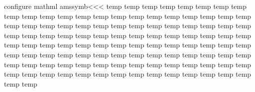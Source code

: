 {{{{{{\<configure mathml amssymb\><<<
\def\:tempa#1"#2#3///{%
   \edef\:next{\noexpand\Configure{MathClass}{\ifnum 0=#2
                                     \mathordMathClass \else #2\fi}}%
   \:next
}
\def\:temp#1{\expandafter\:tempc\meaning#1//}
\def\:tempb#1{\:tempa#1///{}{}{}{#1}}
\def\:tempc#1"#2//{\:tempd#2...//}
\def\:tempd#1#2#3#4#5//{%
   \if #4.\:tempb{\mathchar"0#1#2#3}\else
          \:tempb{\mathchar"#1#2#3#4}\fi
}
\:temp \boxdot
\:temp \boxplus
\:temp \boxtimes
\:temp \centerdot
\:temp \boxminus
\:temp \veebar
\:temp \barwedge
\:temp \doublebarwedge
\:temp \Cup
\:temp \Cap
\:temp \curlywedge
\:temp \curlyvee
\:temp \leftthreetimes
\:temp \rightthreetimes
\:temp \dotplus
\:temp \intercal
\:temp \circledcirc
\:temp \circledast
\:temp \circleddash
\:temp \divideontimes
\:temp \lessdot
\:temp \gtrdot
\:temp \ltimes
\:temp \rtimes
\:temp \smallsetminus
\:temp \circlearrowright
\:temp \circlearrowleft
\:temp \leftrightharpoons
\:temp \Vdash
\:temp \Vvdash
\:temp \vDash
\:temp \twoheadrightarrow
\:temp \twoheadleftarrow
\:temp \leftleftarrows
\:temp \rightrightarrows
\:temp \upuparrows
\:temp \downdownarrows
\:temp \upharpoonright
\:temp \downharpoonright
\:temp \upharpoonleft
\:temp \downharpoonleft
\:temp \rightarrowtail
\:temp \leftarrowtail
\:temp \leftrightarrows
\:temp \rightleftarrows
\:temp \Lsh
\:temp \Rsh
\:temp \rightsquigarrow
\:temp \leftrightsquigarrow
\:temp \looparrowleft
\:temp \looparrowright
\:temp \circeq
\:temp \succsim
\:temp \gtrsim
\:temp \gtrapprox
\:temp \multimap
\:temp \therefore
\:temp \because
\:temp \doteqdot
\:temp \triangleq
\:temp \precsim
\:temp \lesssim
\:temp \lessapprox
\:temp \eqslantless
\:temp \eqslantgtr
\:temp \curlyeqprec
\:temp \curlyeqsucc
\:temp \preccurlyeq
\:temp \leqq
\:temp \leqslant
\:temp \lessgtr
\:temp \risingdotseq
\:temp \fallingdotseq
\:temp \succcurlyeq
\:temp \geqq
\:temp \geqslant
\:temp \gtrless
\:temp \vartriangleright
\:temp \vartriangleleft
\:temp \trianglerighteq
\:temp \trianglelefteq
\:temp \between
\:temp \blacktriangleright
\:temp \blacktriangleleft
\:temp \vartriangle
\:temp \eqcirc
\:temp \lesseqgtr
\:temp \gtreqless
\:temp \lesseqqgtr
\:temp \gtreqqless
\:temp \Rrightarrow
\:temp \Lleftarrow
\:temp \varpropto
\:temp \smallsmile
\:temp \smallfrown
\:temp \Subset
\:temp \Supset
\:temp \subseteqq
\:temp \supseteqq
\:temp \bumpeq
\:temp \Bumpeq
\:temp \lll
\:temp \ggg
\:temp \pitchfork
\:temp \backsim
\:temp \backsimeq
\:temp \lvertneqq
\:temp \gvertneqq
}}}}}}
